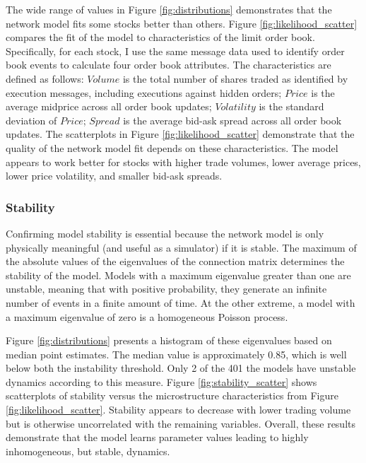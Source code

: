 			The wide range of values in Figure \ref{fig:distributions} demonstrates that the network model fits some stocks better than others. Figure \ref{fig:likelihood_scatter} compares the fit of the model to characteristics of the limit order book. Specifically, for each stock, I use the same message data used to identify order book events to calculate four order book attributes. The characteristics are defined as follows: $Volume$ is the total number of shares traded as identified by execution messages, including executions against hidden orders; $Price$ is the average midprice across all order book updates; $Volatility$ is the standard deviation of $Price$; $Spread$ is the average bid-ask spread across all order book updates. The scatterplots in Figure \ref{fig:likelihood_scatter} demonstrate that the quality of the network model fit depends on these characteristics. The model appears to work better for stocks with higher trade volumes, lower average prices, lower price volatility, and smaller bid-ask spreads.

		\subsubsection{Stability}
			Confirming model stability is essential because the network model is only physically meaningful (and useful as a simulator) if it is stable. The maximum of the absolute values of the eigenvalues of the connection matrix determines the stability of the model. Models with a maximum eigenvalue greater than one are unstable, meaning that with positive probability, they generate an infinite number of events in a finite amount of time. At the other extreme, a model with a maximum eigenvalue of zero is a homogeneous Poisson process.

 			Figure \ref{fig:distributions} presents a histogram of these eigenvalues based on median point estimates. The median value is approximately 0.85, which is well below both the instability threshold. Only 2 of the 401 the models have unstable dynamics according to this measure. Figure \ref{fig:stability_scatter} shows scatterplots of stability versus the microstructure characteristics from Figure \ref{fig:likelihood_scatter}. Stability appears to decrease with lower trading volume but is otherwise uncorrelated with the remaining variables. Overall, these results demonstrate that the model learns parameter values leading to highly inhomogeneous, but stable, dynamics.

